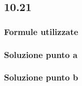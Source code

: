 \documentclass[../../main.tex]{subfiles}
\begin{document}
\subsection*{10.21}
\subsubsection*{Formule utilizzate}
\subsubsection*{Soluzione punto a}
\subsubsection*{Soluzione punto b}
\newpage
\end{document}
